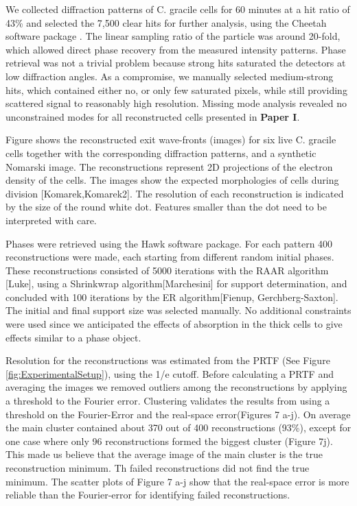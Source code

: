 We collected diffraction patterns of C. gracile cells for 60 minutes at a hit ratio of 43\% and selected the 7,500 clear hits for further analysis, using the Cheetah software package \cite{Barty2014}. The linear sampling ratio of the particle was around 20-fold, which allowed direct phase recovery from the measured intensity patterns. Phase retrieval was not a trivial problem because strong hits saturated the detectors at low diffraction angles. As a compromise, we manually selected medium-strong hits, which contained either no, or only few saturated pixels, while still providing scattered signal to reasonably high resolution. Missing mode analysis revealed no unconstrained modes for all reconstructed cells presented in \textbf{Paper I}. 

Figure  shows the reconstructed exit wave-fronts (images) for six live C. gracile cells together with the corresponding diffraction patterns, and a synthetic Nomarski image. The reconstructions represent 2D projections of the electron density of the cells. The images show the expected morphologies of cells during division [Komarek,Komarek2]. The resolution of each  reconstruction is indicated by the size of the round white dot. Features smaller than the dot need to be interpreted with care.

Phases were retrieved using the Hawk software package. For each pattern 400 reconstructions were made, each starting from different random initial phases. These reconstructions consisted of 5000 iterations with the RAAR algorithm [Luke], using a Shrinkwrap algorithm[Marchesini] for support determination, and concluded with 100 iterations by the ER algorithm[Fienup, Gerchberg-Saxton]. The initial and final support size was selected manually. No additional constraints were used since we anticipated the effects of absorption in the thick cells to give effects similar to a phase object. 

Resolution for the reconstructions was estimated from the PRTF (See Figure \ref{fig:ExperimentalSetup}), using the 1/e cutoff. Before calculating a PRTF and averaging the images we removed outliers among the reconstructions by applying a threshold to the Fourier error. Clustering validates the results from using a threshold on the Fourier-Error and the real-space error(Figures 7 a-j). On average the main cluster contained about 370 out of 400 reconstructions (93\%), except for one case where only 96 reconstructions formed the biggest cluster (Figure 7j). This made us believe that the average image of the main cluster is the true reconstruction minimum. Th failed reconstructions did not find the true minimum.
The scatter plots of Figure 7 a-j show that the real-space error is more reliable than the Fourier-error for identifying failed reconstructions.

